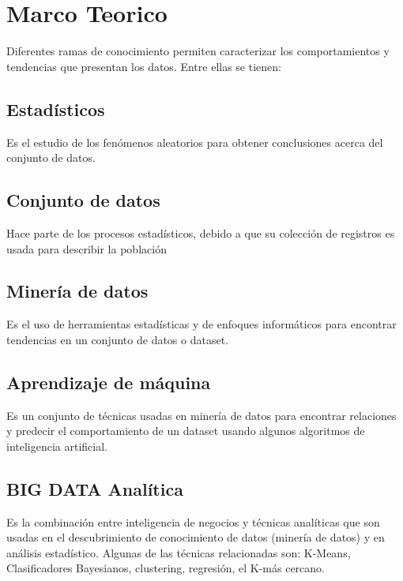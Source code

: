 \section{Marco Teorico}
Diferentes ramas de conocimiento permiten caracterizar los comportamientos y tendencias que presentan los datos. Entre ellas se tienen:
 \subsection{Estadísticos}
 Es el estudio de los fenómenos aleatorios para obtener conclusiones acerca del conjunto de datos.
 \subsection{Conjunto de datos}
 Hace parte de los procesos estadísticos, debido a que su colección de registros es usada para describir la población
 \subsection{Minería de datos}
 Es el uso de herramientas estadísticas y de enfoques informáticos para encontrar tendencias en un conjunto de datos o dataset.
 \subsection{Aprendizaje de máquina}
 Es un conjunto de técnicas usadas en minería de datos para encontrar relaciones y predecir el comportamiento de un dataset usando algunos algoritmos de inteligencia artificial.
 \subsection{BIG DATA Analítica}
 Es la combinación entre inteligencia de negocios y técnicas analíticas que son usadas en el descubrimiento de conocimiento de datos (minería de datos) y en análisis estadístico. Algunas de las técnicas relacionadas son: K-Means, Clasificadores Bayesianos, clustering, regresión, el K-más cercano.
 
